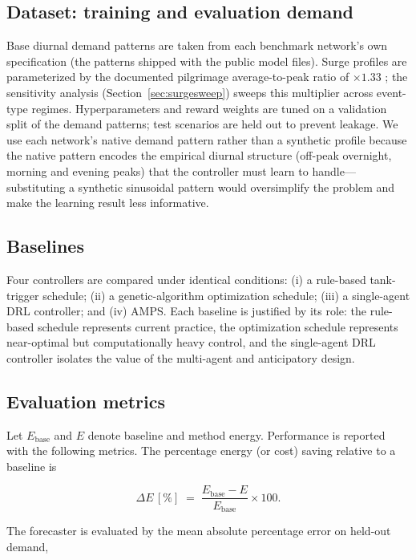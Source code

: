 \documentclass[11pt,a4paper]{article}
\begin{document}
\subsection{Dataset: training and evaluation demand}
\label{sec:dataset}
Base diurnal demand patterns are taken from each benchmark network's own
specification (the patterns shipped with the public model files). Surge profiles
are parameterized by the documented pilgrimage average-to-peak ratio of
$\times1.33$ \citep{SWA2025HajjReadiness}; the sensitivity analysis
(Section~\ref{sec:surgesweep}) sweeps this multiplier across event-type regimes.
Hyperparameters and reward weights are tuned on a validation split of the demand
patterns; test scenarios are held out to prevent leakage. We use each network's
native demand pattern rather than a synthetic profile because the native pattern
encodes the empirical diurnal structure (off-peak overnight, morning and evening
peaks) that the controller must learn to handle---substituting a synthetic
sinusoidal pattern would oversimplify the problem and make the learning result
less informative.

\subsection{Baselines}
Four controllers are compared under identical conditions: (i) a rule-based
tank-trigger schedule; (ii) a genetic-algorithm optimization schedule; (iii) a
single-agent DRL controller; and (iv) AMPS. Each baseline is justified by its
role: the rule-based schedule represents current practice, the optimization
schedule represents near-optimal but computationally heavy control, and the
single-agent DRL controller isolates the value of the multi-agent and
anticipatory design.

\subsection{Evaluation metrics}
\label{sec:metrics}
Let $E_{\mathrm{base}}$ and $E$ denote baseline and method energy. Performance is
reported with the following metrics. The percentage energy (or cost) saving
relative to a baseline is

\begin{equation}
\label{eq:saving}
\Delta E\,[\%] \;=\; \frac{E_{\mathrm{base}} - E}{E_{\mathrm{base}}}\times 100 .
\end{equation}

The forecaster is evaluated by the mean absolute percentage error on held-out
demand,
\end{document}
